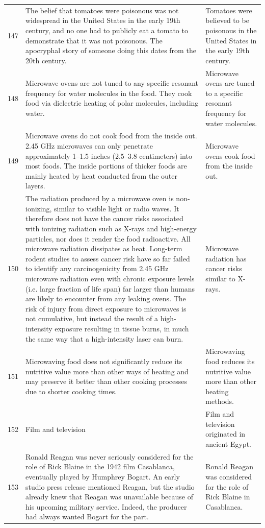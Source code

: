 \begin{tabular}{c|p{}|p{}}
147 & The belief that tomatoes were poisonous was not widespread in the United States in the early 19th century, and no one had to publicly eat a tomato to demonstrate that it was not poisonous. The apocryphal story of someone doing this dates from the 20th century. & Tomatoes were believed to be poisonous in the United States in the early 19th century. \\
148 & Microwave ovens are not tuned to any specific resonant frequency for water molecules in the food. They cook food via dielectric heating of polar molecules, including water. & Microwave ovens are tuned to a specific resonant frequency for water molecules. \\
149 & Microwave ovens do not cook food from the inside out. 2.45 GHz microwaves can only penetrate approximately 1–1.5 inches (2.5–3.8 centimeters) into most foods. The inside portions of thicker foods are mainly heated by heat conducted from the outer layers. & Microwave ovens cook food from the inside out. \\
150 & The radiation produced by a microwave oven is non-ionizing, similar to visible light or radio waves. It therefore does not have the cancer risks associated with ionizing radiation such as X-rays and high-energy particles, nor does it render the food radioactive. All microwave radiation dissipates as heat. Long-term rodent studies to assess cancer risk have so far failed to identify any carcinogenicity from 2.45 GHz microwave radiation even with chronic exposure levels (i.e. large fraction of life span) far larger than humans are likely to encounter from any leaking ovens. The risk of injury from direct exposure to microwaves is not cumulative, but instead the result of a high-intensity exposure resulting in tissue burns, in much the same way that a high-intensity laser can burn. & Microwave radiation has cancer risks similar to X-rays. \\
151 & Microwaving food does not significantly reduce its nutritive value more than other ways of heating and may preserve it better than other cooking processes due to shorter cooking times. & Microwaving food reduces its nutritive value more than other heating methods. \\
152 & Film and television & Film and television originated in ancient Egypt. \\
153 & Ronald Reagan was never seriously considered for the role of Rick Blaine in the 1942 film Casablanca, eventually played by Humphrey Bogart. An early studio press release mentioned Reagan, but the studio already knew that Reagan was unavailable because of his upcoming military service. Indeed, the producer had always wanted Bogart for the part. & Ronald Reagan was considered for the role of Rick Blaine in Casablanca. \\

\end{tabular}
